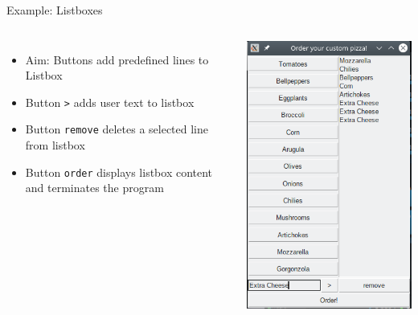 \begin{frame}[fragile]{Example: Listboxes}
%
\begin{columns}[T]
\begin{itemize}
\item Aim: Buttons add predefined lines to Listbox
\item Button \texttt{>} adds user text to listbox
\item Button \texttt{remove} deletes a selected line from listbox
\item Button \texttt{order} displays listbox content and terminates the program
\end{itemize}
%
\begin{tcolorbox}[title=Pizza Order Tool]
\begin{center}
	\includegraphics[width=.5\linewidth]{./gfx/12-tk-listbox}
\end{center}
\end{tcolorbox}
\end{columns}
%
\end{frame}


